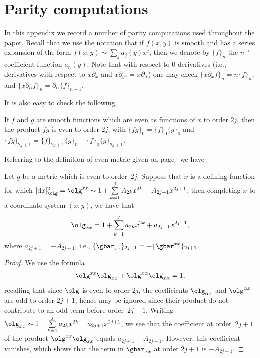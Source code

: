 \appendix

\section{Parity computations} \label{appendix}

In this appendix we record a number of parity computations used throughout the paper. Recall that we use the notation that if $f(x,y)$ is smooth and has a series expansion of the form $f(x,y) \sim \sum_j a_j(y) x^j$, then we denote by $\{f\}_{n}$ the $n^{\mathrm{th}}$ coefficient function $a_n(y)$. Note that with respect to $0$-derivatives (i.e., derivatives with respect to $x \partial_x$ and $x \partial_{y^{\alpha}} = x \partial_{\alpha}$) one may check $\{ x \partial_x f\}_n = n \{f \}_{n},$ and $\{ x \partial_{{\alpha}} f \}_n = \partial_{{\alpha}} \{f\}_{n-1}.$

It is also easy to check the following
\begin{Lemma} \label{lemma:expansion} If $f$ and $g$ are smooth functions which are even as functions of $x$ to order $2j$, then the product $fg$ is even to order $2j$, with $\{ fg\}_0 = \{f\}_0\{g\}_0$ and $\{ fg\}_{2j+1} = \{ f \}_{2j+1} \{g\}_0 + \{f\}_0 \{g\}_{2j+1}$.
\end{Lemma}

Referring to the definition of even metric given on page~\pageref{defn-even} we have
\begin{Lemma} \label{appendix:first-odd-term-olgxx} Let $g$ be a metric which is even to order~$2j$. Suppose that $x$ is a defining function for which
$|{\rm d}x|^2_{\olg} = \olg^{xx} \sim 1 + \sum\limits_{k=1}^{j} A_{2k} x^{2k} + A_{2j+1} x^{2j+1}$; then completing $x$ to a coordinate system $(x,y)$, we have that
\begin{gather*}%
\olg_{xx} = 1 + \sum_{k=1}^{j} a_{2k} x^{2k} + a_{2j+1} x^{2j+1} ,
\end{gather*}
where $a_{2j+1} = -A_{2j+1}$, i.e., $\{ \gbar_{xx} \}_{2j+1} = - \{\gbar^{xx}\}_{2j+1}$.
\end{Lemma}
\begin{proof}We use the formula
\begin{gather*}%
\olg^{xx} \olg_{xx} + \olg^{x\alpha} \olg_{x\alpha} = 1,
\end{gather*}
recalling that since $\olg$ is even to order $2j$, the coefficients $\olg_{\alpha x}$ and $\olg^{\alpha x}$ are odd to order $2j+1$, hence may be ignored since their product do not contribute to an odd term before order~$2j+1$. Writing $\olg_{xx} \sim 1 + \sum\limits_{k=1}^{j} a_{2k} x^{2k} + a_{2j+1} x^{2j+1}$, we see that the coefficient at order~$2j+1$ of the product $\olg^{xx} \olg_{xx}$ equals $a_{2j+1} + A_{2j+1}$. However, this coefficient vanishes, which shows that the term in $\gbar_{xx} $ at order $2j+1$ is $-A_{2j+1}$.
\end{proof}

